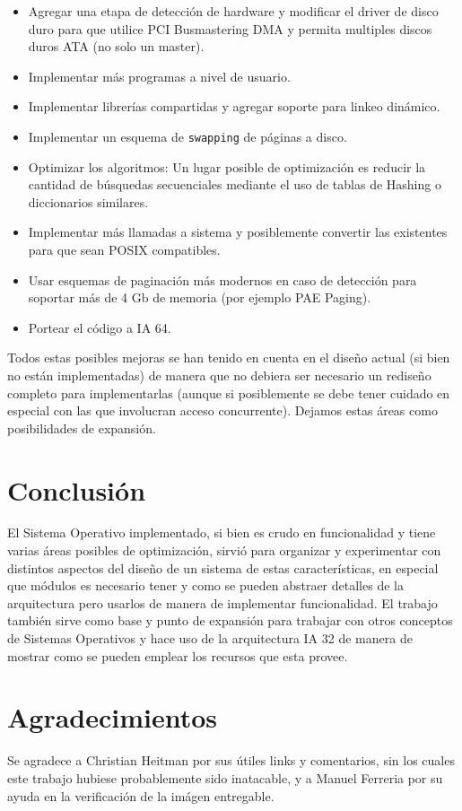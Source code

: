 \begin{itemize}
	resoluciones. Tambi\'en podr\'ia implementarse un driver de sonido para placas Sound Blaster.
	\item Agregar una etapa de detecci\'on de hardware y modificar el driver de disco duro para
	que utilice PCI Busmastering DMA y permita multiples discos duros ATA (no solo un master).
	\item Implementar m\'as programas a nivel de usuario.
	\item Implementar librer\'ias compartidas y agregar soporte para linkeo din\'amico.
	\item Implementar un esquema de \texttt{swapping} de p\'aginas a disco.
	\item Optimizar los algoritmos: Un lugar posible de optimizaci\'on es reducir la
	cantidad de b\'usquedas secuenciales mediante el uso de tablas de Hashing o diccionarios
	similares.
	\item Implementar m\'as llamadas a sistema y posiblemente convertir las existentes para que
	sean POSIX compatibles.
	\item Usar esquemas de paginaci\'on m\'as modernos en caso de detecci\'on para soportar m\'as
	de 4 Gb de memoria (por ejemplo PAE Paging).
	\item Portear el c\'odigo a IA 64.
\end{itemize}

Todos estas posibles mejoras se han tenido en cuenta en el dise\~no actual (si bien no est\'an implementadas)
de manera que no debiera ser necesario un redise\~no completo para implementarlas (aunque si posiblemente se
debe tener cuidado en especial con las que involucran acceso concurrente). Dejamos estas \'areas como posibilidades
de expansi\'on.

\section{Conclusi\'on}

El Sistema Operativo implementado, si bien es crudo en funcionalidad y tiene varias \'areas posibles de optimizaci\'on,
sirvi\'o para organizar y experimentar con distintos aspectos del diseño de un sistema de estas caracter\'isticas, en especial
que m\'odulos es necesario tener y como se pueden abstraer detalles de la arquitectura pero usarlos de manera de implementar
funcionalidad. El trabajo tambi\'en sirve como base y punto de expansi\'on para trabajar con otros conceptos de Sistemas Operativos
y hace uso de la arquitectura IA 32 de manera de mostrar como se pueden emplear los recursos que esta provee.

\section{Agradecimientos}

Se agradece a Christian Heitman por sus \'utiles links y comentarios, sin los cuales este trabajo hubiese probablemente sido inatacable,
y a Manuel Ferreria por su ayuda en la verificaci\'on de la im\'agen entregable.
